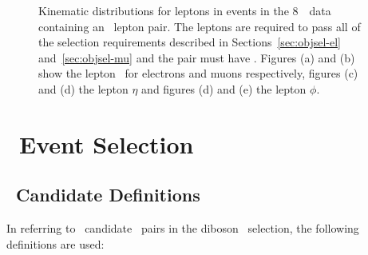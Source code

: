 \begin{figure}[h]
{        }
    \caption[Lepton kinematic distributions for \dilep\ events in the 8~\tev\
    data. ]
    {\small Kinematic distributions for leptons in events in the 8~\tev\
    data containing an \ossf\ lepton pair. The leptons are required to pass all of the selection
    requirements described in Sections~\ref{sec:objsel-el}
    and~\ref{sec:objsel-mu} and the pair must have \sstooos. 
    Figures (a) and (b) show the lepton \pt\ for electrons and muons
    respectively, figures (c) and (d) the lepton $\eta$ and figures (d) and (e)
    the lepton $\phi$.    }
\label{fig:dilep-lepkin-eight}
\end{figure}


\section{\ZZ\ Event Selection}
\label{sec:eventsel}

\subsection{\Z\ Candidate Definitions}

In referring to \Z\ candidate \dilep\ pairs in the diboson \ZZ\ selection, the following definitions are used:

